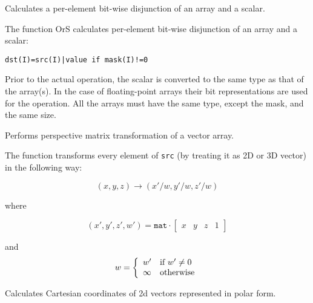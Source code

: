 Calculates a per-element bit-wise disjunction of an array and a scalar.


\begin{description}
\end{description}


The function OrS calculates per-element bit-wise disjunction of an array and a scalar:

\begin{lstlisting}
dst(I)=src(I)|value if mask(I)!=0
\end{lstlisting}

Prior to the actual operation, the scalar is converted to the same type as that of the array(s). In the case of floating-point arrays their bit representations are used for the operation. All the arrays must have the same type, except the mask, and the same size.


Performs perspective matrix transformation of a vector array.


\begin{description}
\end{description}


The function transforms every element of \texttt{src} (by treating it as 2D or 3D vector) in the following way:

\[ (x, y, z) \rightarrow (x'/w, y'/w, z'/w) \]

where

\[
(x', y', z', w') = \texttt{mat} \cdot
\begin{bmatrix} x & y & z & 1 \end{bmatrix}
\]

and
\[ w = \left\{ \begin{array}{l l} w' & \mbox{if $w' \ne 0$}\\ \infty & \mbox{otherwise}\\ \end{array} \right. \]

Calculates Cartesian coordinates of 2d vectors represented in polar form.

